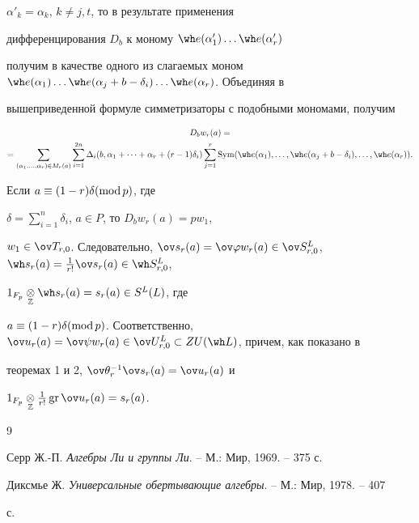 $\alpha'_k=\alpha_k$, $k\ne j,t$, то в результате применения 


дифференцирования $D_b$ к моному $\wh e(\alpha'_1)\dotsc\wh e(\alpha'_r)$ 


получим в качестве одного из слагаемых моном $\wh e(\alpha_1)\dotsc\wh 


e(\alpha_j+b-\delta_i)\dotsc \wh e(\alpha_r)$. Объединяя в 


вышеприведенной формуле симметризаторы с подобными мономами, получим 


\begin{multline*} 


D_b w_r(a)= \\


=\sum_{(\alpha_1,\dotsc,\alpha_r)\in M_r(a)} 


\sum^{2n}_{i=1}\Delta_i(b,\alpha_1+\dotsb+\alpha_r+ 


(r-1)\delta_i)\sum^r_{j=1}\Sym(\wh e(\alpha_1),\dotsc, 


\wh e(\alpha_j+b-\delta_i),\dotsc,\wh e(\alpha_r)). 


\end{multline*}  


Если $a\equiv(1-r)\delta(\operatorname{mod} p)$, где 


$\delta=\sum\limits^n_{i=1}\delta_i$, $a\in P$, то $D_b w_r(a)=p w_1$, 


$w_1\in \ov T_{r,0}$. Следовательно, $\ov s_r(a)=\ov\varphi w_r(a)\in\ov 


S^L_{r,0}$, $\wh s_r(a)=\frac{1}{r!}\ov s_r(a)\in\wh S^L_{r,0}$, 


$1_{F_p}\down{\Bbb Z}{\otimes}\wh s_r(a)=s_r(a)\in S^L(L)$, где 


$a\equiv (1-r)\delta(\Mod p)$. Соответственно, $\ov u_r(a)=\ov\psi 


w_r(a)\in\ov U^L_{r,0}\subset Z U(\wh L)$, причем, как показано в 


теоремах 1 и 2, $\ov\theta^{-1}_r\ov s_r(a)=\ov u_r(a)$ и 


$1_{F_p}\down{\Bbb Z}{\otimes}\frac{1}{r!}\gr\ov u_r(a)=s_r(a)$. 





\begin{thebibliography}{9}







Серр Ж.-П. {\em Алгебры Ли и группы Ли}. -- М.: Мир, 1969. -- 375 с. 




Диксмье Ж. {\em Универсальные обертывающие алгебры}. -- М.: Мир, 1978. -- 407 


с. 





\end{thebibliography}





